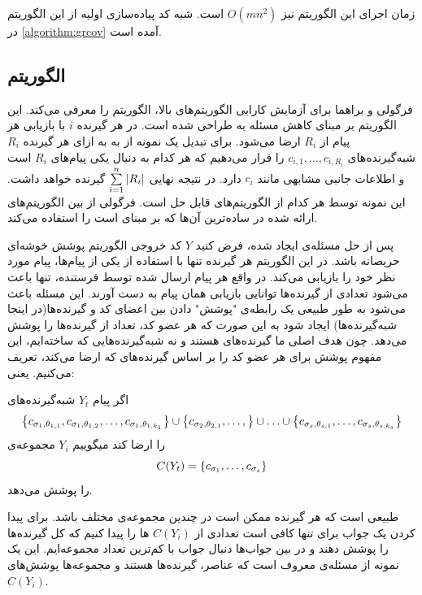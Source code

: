 زمان اجرای این الگوریتم نیز
$O(mn^2)$
است. شبه کد پیاده‌سازی اولیه از این الگوریتم در
\autoref{algorithm:grcov}
آمده است.

\subsection{الگوریتم }
فرگولی و براهما برای آزمایش کارایی الگوریتم‌های بالا، الگوریتم
را معرفی می‌کند. این الگوریتم بر مبنای کاهش مسئله به
\icod
طراحی شده است. در
\picod
هر گیرنده
$i$
با بازیابی هر پیام از
$R_i$
ارضا می‌شود. برای تبدیل یک نمونه از
\picod
به
\icod
به ازای هر گیرنده
$R_i$
شبه‌گیرنده‌های
$c_{i, 1}, \ldots, c_{i, {R_i}}$
را قرار می‌دهیم که هر کدام به دنبال یکی پیام‌های
$R_i$
است و اطلاعات جانبی مشابهی مانند
$c_i$
دارد. در نتیجه
\icod
نهایی
$\sum\limits_{i = 1}^{n} \left|{R_i}\right|$
گیرنده خواهد داشت. این نمونه توسط هر کدام از الگوریتم‌های
\icod
قابل حل است. فرگولی از بین الگوریتم‌های ارائه شده در
\cite{25}
ساده‌ترین آن‌ها که بر مبنای
است را استفاده می‌کند.

پس از حل مسئله‌ی
\icod
ایجاد شده، فرض کنید
$Y$
کد خروجی الگوریتم پوشش خوشه‌ای حریصانه باشد. در این الگوریتم هر گیرنده تنها با استفاده از یکی از پیام‌ها، پیام مورد نظر خود را بازیابی می‌کند. در واقع هر پیام ارسال شده توسط فرستنده، تنها باعث می‌شود تعدادی از گیرنده‌ها توانایی بازیابی همان پیام به دست آورند. این مسئله باعث می‌شود به طور طبیعی یک رابطه‌ی "پوشش" دادن بین اعضای کد و گیرنده‌ها(در اینجا شبه‌گیرنده‌ها) ایجاد شود به این صورت که هر عضو کد، تعداد از گیرنده‌ها را پوشش می‌دهد. چون هدف اصلی ما گیرنده‌های
\picod
هستند و نه شبه‌گیرنده‌هایی که ساخته‌ایم، این مفهوم پوشش برای هر عضو کد را بر اساس گیرنده‌های \picod که ارضا می‌کند، تعریف می‌کنیم. یعنی:

\begin{definition}
    اگر پیام
    $Y_t$
    شبه‌گیرنده‌های
    $$\left\{ c_{\sigma_1, \theta_{1, 1}}, c_{\sigma_1, \theta_{1, 2}},\ldots, c_{\sigma_1, \theta_{1, k_1}} \right\} \cup \left\{ c_{\sigma_2, \theta_{2, 1}}, \ldots, \right\} \cup \ldots \cup \left\{ c_{\sigma_s, \theta_{s, 1}}, \ldots, c_{\sigma_s, \theta_{s, k_s}} \right\}$$
    را ارضا کند میگوییم $Y_i$ مجموعه‌ی
    $$C(Y_t) =\left\{  c_{\sigma_1}, \ldots, c_{\sigma_s} \right\}$$
    را پوشش می‌دهد.
\end{definition}
طبیعی است که هر گیرنده ممکن است در چندین مجموعه‌ی مختلف باشد. برای پیدا کردن یک جواب برای
\picod
تنها کافی است تعدادی از
$C(Y_i)$
ها را پیدا کنیم که کل گیرنده‌ها را پوشش دهند و در بین جواب‌ها دنبال جواب با کم‌ترین تعداد مجموعه‌‌ایم. این یک نمونه از مسئله‌ی معروف
است که عناصر، گیرنده‌ها هستند و مجموعه‌ها پوشش‌های
$C(Y_i)$.

